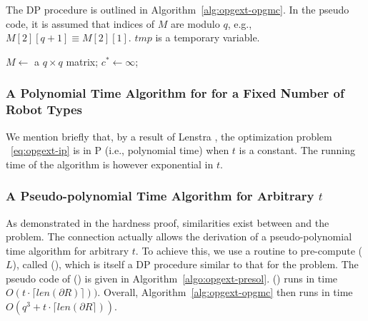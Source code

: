 The DP procedure is outlined in Algorithm~\ref{alg:opgext-opgmc}. In the pseudo code, 
it is assumed that indices of $M$ are modulo $q$, e.g., $M[2][q+1] 
\equiv M[2][1]$. $tmp$ is a temporary variable. 
\begin{comment}
\jy{Generally mathematicians and theoretical computer scientists use 
	$\ell_1, \ldots, \ell_t$ instead of $\ell_1, \ell_2, \ldots, \ell_t$. The later is more 
	redundant. Also, normally we use ldots instead of cdots. I changed $C$ to $M$ since 
    $C$ is used elsewhere. I changed $==$ to $=$ to save space.}
\end{comment}
\begin{algorithm}
    \DontPrintSemicolon
    $M \leftarrow$ a $q\times q$ matrix; $c^* \leftarrow \infty$; \;
    \caption{\opgmcdp}
    \label{alg:opgext-opgmc}
\end{algorithm}

\subsubsection{A Polynomial Time Algorithm for \opgmc for a Fixed Number of Robot Types}
We mention briefly that, by a result of Lenstra \cite{lenstra1983integer}, the optimization problem 
~\eqref{eq:opgext-ip} is in P (i.e., polynomial time) when $t$ is a constant. The running time of 
the algorithm \cite{lenstra1983integer} is however exponential in $t$. 

\subsubsection{A Pseudo-polynomial Time Algorithm for Arbitrary $t$}
As demonstrated in the hardness proof, similarities exist between \opg and the \knapsack 
problem. The connection actually allows the derivation of a pseudo-polynomial time algorithm
for arbitrary $t$. To achieve this, we use a routine to pre-compute \sol($L$), called 
\presol(), which is itself a DP procedure similar to that for the \knapsack problem. The 
pseudo code of \presol() is given in Algorithm~\ref{algo:opgext-presol}.
\presol() runs in time $O(t\cdot\lceil len(\partial R)\rceil))$. Overall, 
Algorithm~\ref{alg:opgext-opgmc} then runs in time $O(q^3+t\cdot\lceil len(\partial R\rceil))$.

